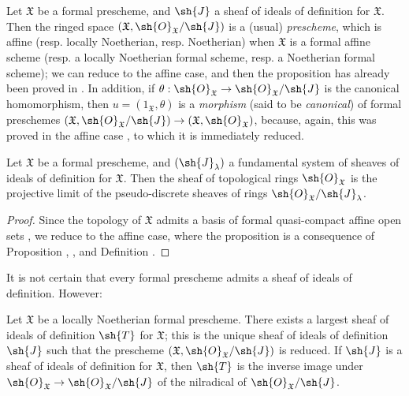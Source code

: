 \begin{env}[10.5.2]
\label{I.10.5.2}
Let $\mathfrak{X}$ be a formal prescheme, and $\sh{J}$ a sheaf of ideals of definition for $\mathfrak{X}$.
Then the ringed space $(\mathfrak{X},\sh{O}_\mathfrak{X}/\sh{J})$ is a (usual) \emph{prescheme}, which is affine (resp. locally Noetherian, resp. Noetherian) when $\mathfrak{X}$ is a formal affine scheme (resp. a locally Noetherian formal scheme, resp. a Noetherian formal scheme);  we can reduce to the affine case, and then the proposition has already been proved in .
In addition, if $\theta:\sh{O}_\mathfrak{X}\to\sh{O}_\mathfrak{X}/\sh{J}$ is the canonical homomorphism, then $u=(1_\mathfrak{X},\theta)$ is a \emph{morphism} (said to be \emph{canonical}) of formal preschemes $(\mathfrak{X},\sh{O}_\mathfrak{X}/\sh{J})\to(\mathfrak{X},\sh{O}_\mathfrak{X})$, because, again, this was proved in the affine case , to which it is immediately reduced.
\end{env}

\begin{proposition}[10.5.3]
\label{I.10.5.3}
Let $\mathfrak{X}$ be a formal prescheme, and $(\sh{J}_\lambda)$ a fundamental system of sheaves of ideals of definition for $\mathfrak{X}$.
Then the sheaf of topological rings $\sh{O}_\mathfrak{X}$ is the projective limit of the pseudo-discrete sheaves of rings  $\sh{O}_\mathfrak{X}/\sh{J}_\lambda$.
\end{proposition}

\begin{proof}
Since the topology of $\mathfrak{X}$ admits a basis of formal quasi-compact affine open sets , we reduce to the affine case, where the proposition is a consequence of Proposition , , and Definition .
\end{proof}

It is not certain that every formal prescheme admits a sheaf of ideals of definition.
However:
\begin{proposition}[10.5.4]
\label{I.10.5.4}
Let $\mathfrak{X}$ be a locally Noetherian formal prescheme.
There exists a largest sheaf of ideals of definition $\sh{T}$ for $\mathfrak{X}$; this is the unique sheaf of ideals of definition $\sh{J}$ such that the prescheme $(\mathfrak{X},\sh{O}_\mathfrak{X}/\sh{J})$ is reduced.
If $\sh{J}$ is a sheaf of ideals of definition for $\mathfrak{X}$, then $\sh{T}$ is the inverse image under $\sh{O}_\mathfrak{X}\to\sh{O}_\mathfrak{X}/\sh{J}$ of the nilradical of $\sh{O}_\mathfrak{X}/\sh{J}$.
\end{proposition}

